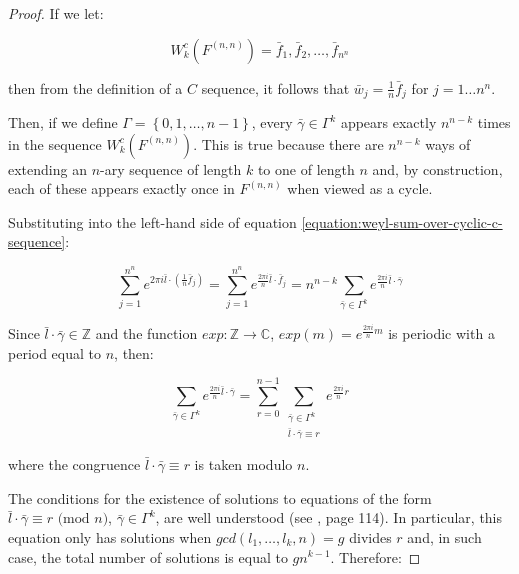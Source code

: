 \documentclass[11pt,a4paper]{tesis}
\theoremstyle{plain}
\theoremstyle{definition}
\begin{document}
\begin{proof}
  If we let:

  \begin{equation*}
    W_k^c\left(F^{(n, n)}\right) = \bar{f}_1, \bar{f}_2, \dots, \bar{f}_{n^n}
  \end{equation*}

  then from the definition of a $C$ sequence, it follows that $\bar{w}_j = \frac{1}{n} \bar{f}_j$ for $j = 1 \dots n^n$.
  
  Then, if we define $\Gamma = \left \{ 0, 1, \dots, n - 1 \right \} $, every $\bar{\gamma} \in \Gamma^k$ appears exactly $n^{n - k}$ times in the sequence $W_k^c\left(F^{(n, n)}\right)$. This is true because there are  $n^{n - k}$ ways of extending an $n$-ary sequence of length $k$ to one of length $n$ and, by construction, each of these appears exactly once in $F^{(n, n)}$ when viewed as a cycle.
  
  Substituting into the left-hand side of equation \ref{equation:weyl-sum-over-cyclic-c-sequence}:
  
  \begin{equation*}
    \sum_{j = 1}^{n^n} e^{2 \pi i \bar{l} \cdot (\frac{1}{n} \bar{f}_j)} = \sum_{j = 1}^{n^n} e^{\frac{2 \pi i}{n} \bar{l} \cdot \bar{f}_j} = n^{n - k} \sum_{\bar{\gamma} \in \Gamma^k} e^{\frac{2 \pi i}{n} \bar{l} \cdot \bar{\gamma}}
  \end{equation*}

  Since $\bar{l} \cdot \bar{\gamma} \in \mathbb{Z}$ and the function $exp : \mathbb{Z} \to \mathbb{C}$, $exp(m) = e^{\frac{2 \pi i}{n} m}$ is periodic with a period equal to $n$, then:

  \begin{equation*}
    \sum_{\bar{\gamma} \in \Gamma^k} e^{\frac{2 \pi i}{n} \bar{l} \cdot \bar{\gamma}}
    = \sum_{r = 0}^{n - 1}
        \sum_{
          \substack{
            \bar{\gamma} \in \Gamma^k \\
            \bar{l} \cdot \bar{\gamma} \equiv r
          }
        } e^{\frac{2 \pi i}{n} r}
  \end{equation*}

  where the congruence $\bar{l} \cdot \bar{\gamma} \equiv r$ is taken modulo $n$.

  The conditions for the existence of solutions to equations of the form $\bar{l} \cdot \bar{\gamma} \equiv r \text{ (mod $n$)}$, $\bar{\gamma} \in \Gamma^k$, are well understood (see \cite{mccarthy-1986}, page 114). In particular, this equation only has solutions when $gcd(l_1, \dots, l_k, n) = g$ divides $r$ and, in such case, the total number of solutions is equal to $g n^{k - 1}$. Therefore:


\end{proof}
\end{document}
